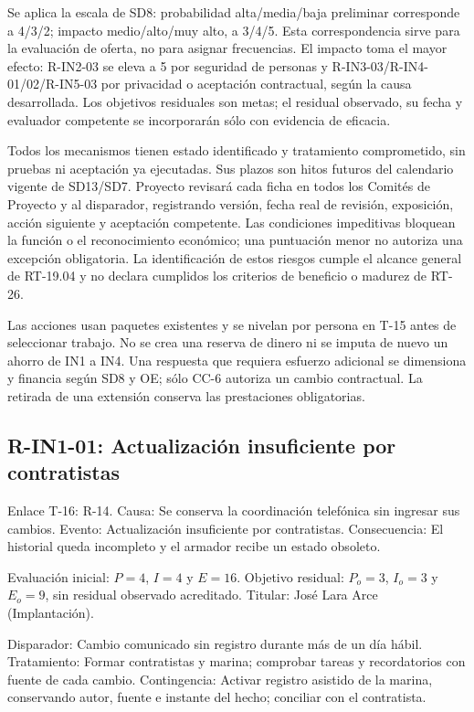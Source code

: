 Se aplica la escala de SD8: probabilidad alta/media/baja preliminar corresponde a 4/3/2; impacto medio/alto/muy alto, a 3/4/5. Esta correspondencia sirve para la evaluación de oferta, no para asignar frecuencias. El impacto toma el mayor efecto: R-IN2-03 se eleva a 5 por seguridad de personas y R-IN3-03/R-IN4-01/02/R-IN5-03 por privacidad o aceptación contractual, según la causa desarrollada. Los objetivos residuales son metas; el residual observado, su fecha y evaluador competente se incorporarán sólo con evidencia de eficacia.

Todos los mecanismos tienen estado identificado y tratamiento comprometido, sin pruebas ni aceptación ya ejecutadas. Sus plazos son hitos futuros del calendario vigente de SD13/SD7. Proyecto revisará cada ficha en todos los Comités de Proyecto y al disparador, registrando versión, fecha real de revisión, exposición, acción siguiente y aceptación competente. Las condiciones impeditivas bloquean la función o el reconocimiento económico; una puntuación menor no autoriza una excepción obligatoria. La identificación de estos riesgos cumple el alcance general de RT-19.04 y no declara cumplidos los criterios de beneficio o madurez de RT-26.

Las acciones usan paquetes existentes y se nivelan por persona en T-15 antes de seleccionar trabajo. No se crea una reserva de dinero ni se imputa de nuevo un ahorro de IN1 a IN4. Una respuesta que requiera esfuerzo adicional se dimensiona y financia según SD8 y OE; sólo CC-6 autoriza un cambio contractual. La retirada de una extensión conserva las prestaciones obligatorias.
\subsection{R-IN1-01: Actualización insuficiente por contratistas}
Enlace T-16: R-14. Causa: Se conserva la coordinación telefónica sin ingresar sus cambios. Evento: Actualización insuficiente por contratistas. Consecuencia: El historial queda incompleto y el armador recibe un estado obsoleto.

Evaluación inicial: $P=4$, $I=4$ y $E=16$. Objetivo residual: $P_o=3$, $I_o=3$ y $E_o=9$, sin residual observado acreditado. Titular: José Lara Arce (Implantación).

Disparador: Cambio comunicado sin registro durante más de un día hábil. Tratamiento: Formar contratistas y marina; comprobar tareas y recordatorios con fuente de cada cambio. Contingencia: Activar registro asistido de la marina, conservando autor, fuente e instante del hecho; conciliar con el contratista.

